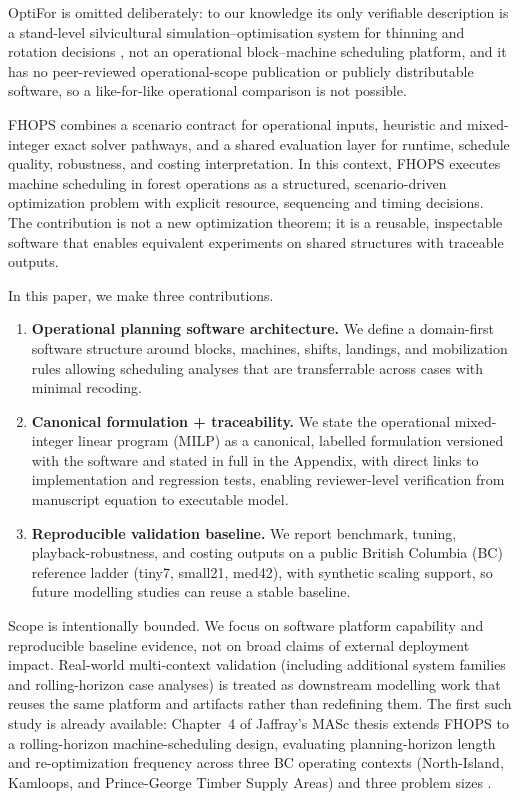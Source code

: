 OptiFor is omitted deliberately: to our knowledge its only verifiable description is a stand-level silvicultural simulation--optimisation system for thinning and rotation decisions \cite{jaffray2026systematic}, not an operational block--machine scheduling platform, and it has no peer-reviewed operational-scope publication or publicly distributable software, so a like-for-like operational comparison is not possible.

FHOPS combines a scenario contract for operational inputs, heuristic and mixed-integer exact solver pathways, and a shared evaluation layer for runtime, schedule quality, robustness, and costing interpretation. In this context, FHOPS executes machine scheduling in forest operations as a structured, scenario-driven optimization problem with explicit resource, sequencing and timing decisions. The contribution is not a new optimization theorem; it is a reusable, inspectable software that enables equivalent experiments on shared structures with traceable outputs.

In this paper, we make three contributions.
\begin{enumerate}
  \item \textbf{Operational planning software architecture.} We define a domain-first software structure around blocks, machines, shifts, landings, and mobilization rules allowing scheduling analyses that are transferrable across cases with minimal recoding.
  \item \textbf{Canonical formulation + traceability.} We state the operational mixed-integer linear program (MILP) as a canonical, labelled formulation versioned with the software and stated in full in the Appendix, with direct links to implementation and regression tests, enabling reviewer-level verification from manuscript equation to executable model.
  \item \textbf{Reproducible validation baseline.} We report benchmark, tuning, playback-robustness, and costing outputs on a public British Columbia (BC) reference ladder (tiny7, small21, med42), with synthetic scaling support, so future modelling studies can reuse a stable baseline.
\end{enumerate}

Scope is intentionally bounded. We focus on software platform capability and reproducible baseline evidence, not on broad claims of external deployment impact. Real-world multi-context validation (including additional system families and rolling-horizon case analyses) is treated as downstream modelling work that reuses the same platform and artifacts rather than redefining them. The first such study is already available: Chapter~4 of Jaffray's MASc thesis extends FHOPS to a rolling-horizon machine-scheduling design, evaluating planning-horizon length and re-optimization frequency across three BC operating contexts (North-Island, Kamloops, and Prince-George Timber Supply Areas) and three problem sizes \cite{jaffray2026thesis}.

